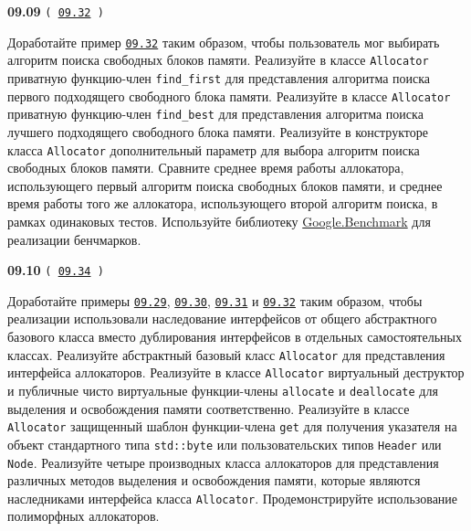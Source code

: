 \documentclass[a4paper,12pt]{article}
\begin{document}
\bigskip

{\large \textbf{09.09} \texttt{(\,\href{https://github.com/i-s-m-mipt/Education/blob/master/projects/examples/source/09.32.cpp}{09.32}\,)}}

\bigskip

Доработайте пример \href{https://github.com/i-s-m-mipt/Education/blob/master/projects/examples/source/09.32.cpp}{\texttt{09.32}} таким образом, чтобы пользователь мог выбирать алгоритм поиска свободных блоков памяти. Реализуйте в классе \lstinline{Allocator} приватную функцию-член \lstinline{find_first} для представления алгоритма поиска первого подходящего свободного блока памяти. Реализуйте в классе \lstinline{Allocator} приватную функцию-член \lstinline{find_best} для представления алгоритма поиска лучшего подходящего свободного блока памяти. Реализуйте в конструкторе класса \lstinline{Allocator} дополнительный параметр для выбора алгоритм поиска свободных блоков памяти. Сравните среднее время работы аллокатора, использующего первый алгоритм поиска свободных блоков памяти, и среднее время работы того же аллокатора, использующего второй алгоритм поиска, в рамках одинаковых тестов. Используйте библиотеку \href{https://github.com/google/benchmark}{Google.Benchmark} для реализации бенчмарков.

\bigskip

{\large \textbf{09.10} \texttt{(\,\href{https://github.com/i-s-m-mipt/Education/blob/master/projects/examples/source/09.34.cpp}{09.34}\,)}}

\bigskip

Доработайте примеры \href{https://github.com/i-s-m-mipt/Education/blob/master/projects/examples/source/09.29.cpp}{\texttt{09.29}}, \href{https://github.com/i-s-m-mipt/Education/blob/master/projects/examples/source/09.30.cpp}{\texttt{09.30}}, \href{https://github.com/i-s-m-mipt/Education/blob/master/projects/examples/source/09.31.cpp}{\texttt{09.31}} и \href{https://github.com/i-s-m-mipt/Education/blob/master/projects/examples/source/09.32.cpp}{\texttt{09.32}} таким образом, чтобы реализации использовали наследование интерфейсов от общего абстрактного базового класса вместо дублирования интерфейсов в отдельных самостоятельных классах. Реализуйте абстрактный базовый класс \lstinline{Allocator} для представления интерфейса аллокаторов. Реализуйте в классе \lstinline{Allocator} виртуальный деструктор и публичные чисто виртуальные функции-члены \lstinline{allocate} и \lstinline{deallocate} для выделения и освобождения памяти соответственно. Реализуйте в классе \lstinline{Allocator} защищенный шаблон функции-члена \lstinline{get} для получения указателя на объект стандартного типа \lstinline{std::byte} или пользовательских типов \lstinline{Header} или \lstinline{Node}. Реализуйте четыре производных класса аллокаторов для представления различных методов выделения и освобождения памяти, которые являются наследниками интерфейса класса \lstinline{Allocator}. Продемонстрируйте использование полиморфных аллокаторов.
\end{document}
